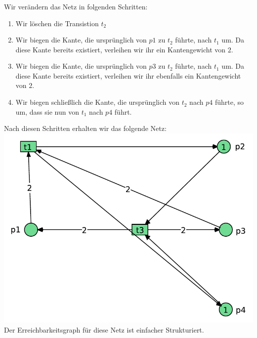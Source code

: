 \documentclass[a4paper,12pt]{scrartcl}
\begin{document}
\subsubsection{}
Wir verändern das Netz in folgenden Schritten:
\begin{enumerate}
  \item
  Wir löschen die Transistion $t_2$
  \item
  Wir biegen die Kante, die ursprünglich von $p1$ zu $t_2$
  führte, nach $t_1$ um. Da diese Kante bereits existiert,
  verleihen wir ihr ein Kantengewicht von $2$.
  \item 
  Wir biegen die Kante, die ursprünglich von $p3$ zu $t_2$
  führte, nach $t_1$ um. Da diese Kante bereits existiert,
  verleihen wir ihr ebenfalls ein Kantengewicht von $2$.
  \item
  Wir biegen schließlich die Kante, die ursprünglich von $t_2$ nach $p4$ führte, so um, dass sie nun von $t_1$ nach $p4$ führt.
\end{enumerate}
Nach diesen Schritten erhalten wir das folgende Netz:\\
\includegraphics[scale=0.8]{G-6-A-07-Netz1-Buczko_Heid_Deinert.pdf}\\
Der Erreichbarkeitsgraph für diese Netz ist einfacher 
Strukturiert.\\
\end{document}
